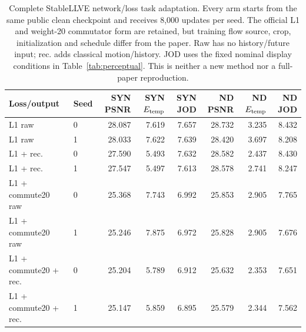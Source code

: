 \begin{table}[t]
\centering\scriptsize\setlength{\tabcolsep}{4pt}
\caption{Complete StableLLVE network/loss task adaptation. Every arm starts from the same public clean checkpoint and receives 8,000 updates per seed. The official L1 and weight-20 commutator form are retained, but training flow source, crop, initialization and schedule differ from the paper. Raw has no history/future input; rec. adds classical motion/history. JOD uses the fixed nominal display conditions in Table~\ref{tab:perceptual}. This is neither a new method nor a full-paper reproduction.}
\label{tab:stablellve-adapted}
\begin{tabular}{llrrrrrr}
\toprule
Loss/output & Seed & SYN PSNR & SYN $E_{\rm temp}$ & SYN JOD & ND PSNR & ND $E_{\rm temp}$ & ND JOD\\
\midrule
L1 raw & 0 & 28.087 & 7.619 & 7.657 & 28.732 & 3.235 & 8.432\\
L1 raw & 1 & 28.033 & 7.622 & 7.639 & 28.420 & 3.697 & 8.208\\
L1 + rec. & 0 & 27.590 & 5.493 & 7.632 & 28.582 & 2.437 & 8.430\\
L1 + rec. & 1 & 27.547 & 5.497 & 7.613 & 28.578 & 2.741 & 8.247\\
L1 + commute20 raw & 0 & 25.368 & 7.743 & 6.992 & 25.853 & 2.905 & 7.765\\
L1 + commute20 raw & 1 & 25.246 & 7.875 & 6.972 & 25.828 & 2.905 & 7.676\\
L1 + commute20 + rec. & 0 & 25.204 & 5.789 & 6.912 & 25.632 & 2.353 & 7.651\\
L1 + commute20 + rec. & 1 & 25.147 & 5.859 & 6.895 & 25.579 & 2.344 & 7.562\\
\bottomrule
\end{tabular}
\end{table}
